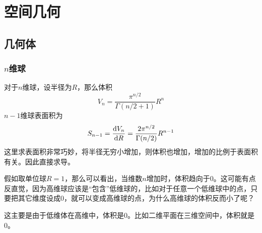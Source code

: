 \chapter{空间几何}
%
\section{几何体}
\subsection{$n$维球}\label{ndsphere}
对于$n$维球，设半径为$R$，那么体积
$$V_n=\frac{\pi^{n/2}}{\Gamma(n/2+1)}R^n$$
$n-1$维球表面积为
$$S_{n-1}=\frac{\mathop{}\!\mathrm{d} V_n}{\mathop{}\!\mathrm{d} R}=\frac{2\pi^{n/2}}{\Gamma(n/2)}R^{n-1}$$
这里求表面积非常巧妙，将半径无穷小增加，则体积也增加，增加的比例于表面积有关。因此直接求导。

假如取单位球$R=1$，那么可以看出，当维数$n$增加时，体积趋向于0。这可能有点反直觉，因为高维球应该是“包含”低维球的，比如对于任意一个低维球中的点，只要把其它维度设成0，就可以变成高维球的点，为什么高维球的体积反而小了呢？

这主要是由于低维体在高维中，体积是0。比如二维平面在三维空间中，体积就是0。